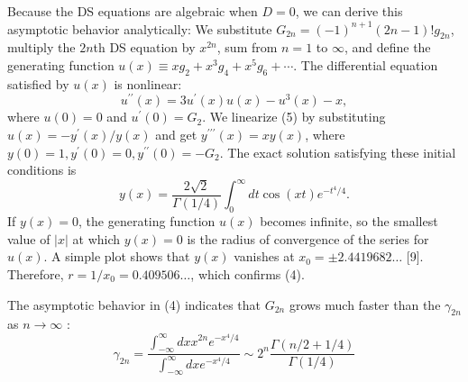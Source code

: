 Because the DS equations are algebraic when \(D=0\), we can derive this asymptotic behavior analytically: We substitute \(G_{2 n}=(-1)^{n+1}(2 n-1) ! g_{2 n}\), multiply the \(2 n\)th DS equation by \(x^{2 n}\), sum from \(n=1\) to \(\infty\), and define the generating function \(u(x) \equiv x g_2+x^3 g_4+x^5 g_6+\cdots\). The differential equation satisfied by \(u(x)\) is nonlinear:
\[
u^{\prime \prime}(x)=3 u^{\prime}(x) u(x)-u^3(x)-x,
\]
where \(u(0)=0\) and \(u^{\prime}(0)=G_2\). We linearize (5) by substituting \(u(x)=-y^{\prime}(x) / y(x)\) and get \(y^{\prime \prime \prime}(x)=x y(x)\), where \(y(0)=1, y^{\prime}(0)=0, y^{\prime \prime}(0)=-G_2\). The exact solution satisfying these initial conditions is
\[
y(x)=\frac{2 \sqrt{2}}{\Gamma(1 / 4)} \int_0^{\infty} d t \cos (x t) e^{-t^4 / 4} .
\]
If \(y(x)=0\), the generating function \(u(x)\) becomes infinite, so the smallest value of \(|x|\) at which \(y(x)=0\) is the radius of convergence of the series for \(u(x)\). A simple plot shows that \(y(x)\) vanishes at \(x_0= \pm 2.4419682 \ldots\) [9]. Therefore, \(r=1 / x_0=0.409506 \ldots\), which confirms (4).

The asymptotic behavior in (4) indicates that \(G_{2 n}\) grows much faster than the \(\gamma_{2 n}\) as \(n \rightarrow \infty\) :
\[
\gamma_{2 n}=\frac{\int_{-\infty}^{\infty} d x x^{2 n} e^{-x^4 / 4}}{\int_{-\infty}^{\infty} d x e^{-x^4 / 4}} \sim 2^n \frac{\Gamma(n / 2+1 / 4)}{\Gamma(1 / 4)}
\]
